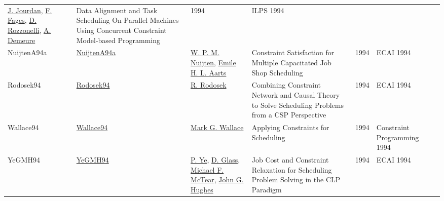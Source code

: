 {\begin{longtable}{p{2cm}p{2cm}p{5cm}p{10cm}rp{3cm}l}
\hyperref[auth:a700]{J. Jourdan}, \hyperref[auth:a701]{F. Fages}, \hyperref[auth:a702]{D. Rozzonelli}, \hyperref[auth:a703]{A. Demeure} & Data Alignment and Task Scheduling On Parallel Machines Using Concurrent Constraint Model-based Programming & 1994 & ILPS 1994 & \cite{JourdanFRD94}\\NuijtenA94a & \href{}{NuijtenA94a} & \hyperref[auth:a1275]{W. P. M. Nuijten}, \hyperref[auth:a1276]{Emile H. L. Aarts} & Constraint Satisfaction for Multiple Capacitated Job Shop Scheduling & 1994 & ECAI 1994 & \cite{NuijtenA94a}\\Rodosek94 & \href{}{Rodosek94} & \hyperref[auth:a299]{R. Rodosek} & Combining Constraint Network and Causal Theory to Solve Scheduling Problems from a {CSP} Perspective & 1994 & ECAI 1994 & \cite{Rodosek94}\\Wallace94 & \href{}{Wallace94} & \hyperref[auth:a117]{Mark G. Wallace} & Applying Constraints for Scheduling & 1994 & Constraint Programming 1994 & \cite{Wallace94}\\YeGMH94 & \href{}{YeGMH94} & \hyperref[auth:a1277]{P. Ye}, \hyperref[auth:a1278]{D. Glass}, \hyperref[auth:a1279]{Michael F. McTear}, \hyperref[auth:a1280]{John G. Hughes} & Job Cost and Constraint Relaxation for Scheduling Problem Solving in the {CLP} Paradigm & 1994 & ECAI 1994 & \cite{YeGMH94}\\\end{longtable}
}

